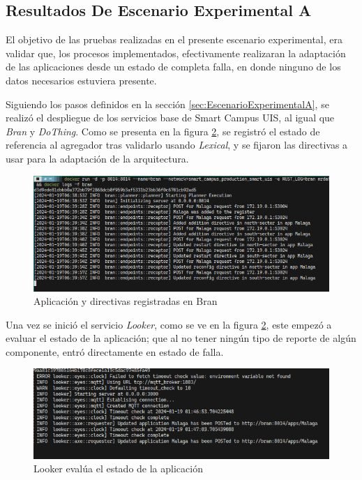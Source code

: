 \subsection{Resultados De Escenario Experimental A}

El objetivo de las pruebas realizadas en el presente escenario experimental, era validar que, los procesos implementados, efectivamente realizaran la adaptación de las aplicaciones desde un estado de completa falla, en donde ninguno de los datos necesarios estuviera presente.

Siguiendo los pasos definidos en la sección \ref{sec:EscenarioExperimentalA}, se realizó el despliegue de los servicios base de Smart Campus UIS, al igual que \textit{Bran} y \textit{DoThing}. Como se presenta en la figura \ref{fig:LookerStart}, se registró el estado de referencia al agregador tras validarlo usando \textit{Lexical}, y se fijaron las directivas a usar para la adaptación de la arquitectura.

\begin{figure}[ht]
    \centering
    \caption{Aplicación y directivas registradas en Bran}
    \label{fig:BranStart}
    \includegraphics[width=0.9\linewidth]{images/BranStart.png}
    \vspace{-4mm}
\end{figure}

Una vez se inició el servicio \textit{Looker}, como se ve en la figura \ref{fig:LookerStart}, este empezó a evaluar el estado de la aplicación; que al no tener ningún tipo de reporte de algún componente, entró directamente en estado de falla. 

\begin{figure}[ht]
    \centering
    \caption{Looker evalúa el estado de la aplicación}
    \label{fig:LookerStart}
    \includegraphics[width=0.9\linewidth]{images/LookerStart.png}
    \vspace{-4mm}
\end{figure}

